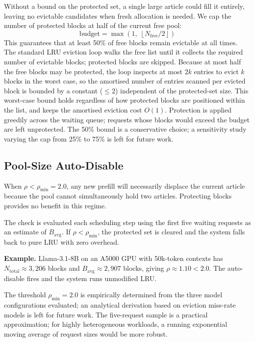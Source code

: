 \documentclass[journal]{IEEEtran}
\newcommand{\rhomin}{\rho_{\min}}
\begin{document}
Without a bound on the protected set, a single large article could fill it
entirely, leaving no evictable candidates when fresh allocation is needed.
We cap the number of protected blocks at half of the current free pool:
\begin{equation}
  \text{budget} = \max\!\left(1,\;\left\lfloor N_{\mathrm{free}}/2\right\rfloor\right)
  \label{eq:budget}
\end{equation}
This guarantees that at least 50\% of free blocks remain evictable at all
times.
The standard LRU eviction loop walks the free list until it collects
the required number of evictable blocks; protected blocks are skipped.
Because at most half the free blocks may be protected, the loop inspects at
most $2k$ entries to evict $k$ blocks in the worst case, so the amortised
number of entries scanned per evicted block is bounded by a constant
($\leq 2$) independent of the protected-set size.
This worst-case bound holds regardless of how protected blocks are positioned
within the list, and keeps the amortised eviction cost $O(1)$.
Protection is applied
greedily across the waiting queue; requests whose blocks would exceed the
budget are left unprotected.  The 50\% bound is a conservative choice; a
sensitivity study varying the cap from 25\% to 75\% is left for future work.

\subsection{Pool-Size Auto-Disable}

When $\rho < \rhomin = 2.0$, any new prefill will necessarily displace the
current article because the pool cannot simultaneously hold two articles.
Protecting blocks provides no benefit in this regime.

The check is evaluated each scheduling step using the first five waiting
requests as an estimate of $B_{\mathrm{avg}}$.  If $\rho < \rhomin$, the
protected set is cleared and the system falls back to pure LRU with zero
overhead.

\textbf{Example.}  Llama-3.1-8B on an A5000 GPU with 50k-token contexts
has $N_{\mathrm{total}}\approx3{,}206$ blocks and
$B_{\mathrm{avg}}\approx2{,}907$ blocks, giving $\rho\approx1.10<2.0$.
The auto-disable fires and the system runs unmodified LRU.

The threshold $\rhomin=2.0$ is empirically determined from the three model
configurations evaluated; an analytical derivation based on eviction
miss-rate models is left for future work.  The five-request sample is a
practical approximation; for highly heterogeneous workloads, a running
exponential moving average of request sizes would be more robust.
\end{document}
